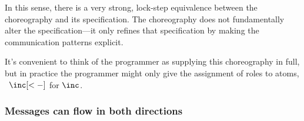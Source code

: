 \documentclass[
  class=../hdeyoung-proposal,
  crop=false
]{standalone}
\begin{document}
\begin{description}[font=\normalfont\itshape, leftmargin=\parindent, labelindent=\leftmargin, listparindent=\parindent, parsep=0pt]
In this sense, there is a very strong, lock-step equivalence between the choreography and its specification.
The choreography does not fundamentally alter the specification---it only refines that specification by making the communication patterns explicit.
\end{description}
%
%
%
It's convenient to think of the programmer as supplying this choreography in full, but in practice the programmer might only give the assignment of roles to atoms, \eg\ $\inc[<-]$ for $\inc$.

\subsubsection{Messages can flow in both directions}\label{sec:chor-binary-count}
\end{document}
